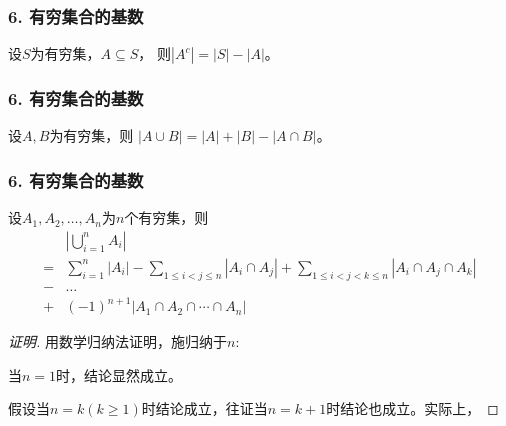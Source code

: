 \documentclass{beamer}
\begin{document}
\begin{CJK*}{UTF8}{gbsn}
\begin{frame}
\frametitle{6. 有穷集合的基数}
\begin{Thm}
  设$S$为有穷集，$A \subseteq S$， 则$|A^c| = |S| - |A|$。
\end{Thm}
\end{frame}

\begin{frame}
\frametitle{6. 有穷集合的基数}
\begin{Thm}
  设$A,B$为有穷集，则
$|A \cup B| = |A| + |B| - |A \cap B|$。
\end{Thm}\pause
\end{frame}
\begin{frame}
  \frametitle{6. 有穷集合的基数}
\begin{Thm}
  设$A_1, A_2, \ldots, A_n$为$n$个有穷集，则
  \begin{equation*}
\begin{split}
    &|\bigcup_{i=1}^nA_i|\\
=&\sum_{i=1}^n|A_i| - \sum_{1\leq i < j \leq n}|A_i \cap A_j| + \sum_{1 \leq  i < j < k \leq n}|A_i \cap A_j \cap A_k|\\
-&\ldots\\
+&(-1)^{n+1}|A_1 \cap A_2 \cap \cdots \cap A_n| 
  \end{split}
\end{equation*}
\end{Thm}
\end{frame}

\begin{frame}
  \begin{proof}[证明]
    用数学归纳法证明，施归纳于$n$:

当$n=1$时，结论显然成立。

假设当$n=k(k \geq 1)$时结论成立，往证当$n=k+1$时结论也成立。实际上，


\end{proof}
\end{frame}
\end{CJK*}
\end{document}
